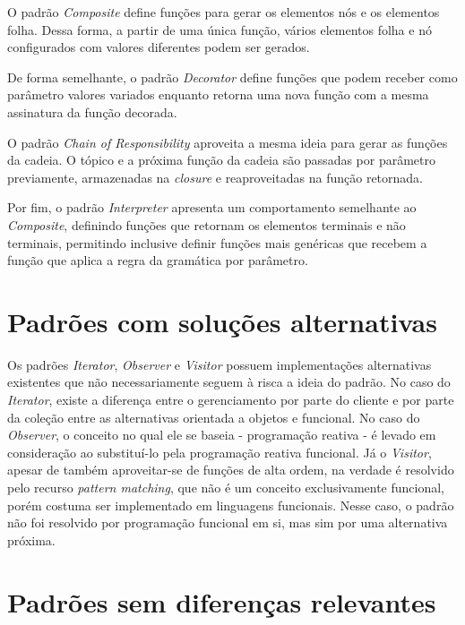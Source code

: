 O padrão \textit{Composite} define funções para gerar os 
elementos nós e os elementos folha. Dessa forma, 
a partir de uma única função, vários elementos 
folha e nó configurados com valores diferentes 
podem ser gerados.

De forma semelhante, o padrão \textit{Decorator} define 
funções que podem receber como parâmetro valores 
variados enquanto retorna uma nova função com 
a mesma assinatura da função decorada. 

O padrão \textit{Chain of Responsibility} aproveita a mesma 
ideia para gerar as funções da cadeia. O tópico e 
a próxima função da cadeia são passadas por parâmetro 
previamente, armazenadas na \textit{closure} e reaproveitadas 
na função retornada. 

Por fim, o padrão \textit{Interpreter} apresenta um comportamento 
semelhante ao \textit{Composite}, definindo funções que retornam 
os elementos terminais e não terminais, permitindo 
inclusive definir funções mais genéricas que recebem 
a função que aplica a regra da gramática por parâmetro.

\section{Padrões com soluções alternativas}

Os padrões \textit{Iterator}, \textit{Observer} e 
\textit{Visitor} possuem 
implementações alternativas existentes que não 
necessariamente 
seguem à risca a ideia do padrão. No caso do \textit{Iterator}, 
existe a diferença entre o gerenciamento por parte 
do cliente e por parte da coleção entre as 
alternativas orientada a objetos e funcional. No 
caso do \textit{Observer}, o conceito no qual ele se 
baseia - programação reativa - é levado em 
consideração ao substituí-lo pela programação 
reativa funcional. Já o \textit{Visitor}, apesar de também 
aproveitar-se de funções de alta ordem, na verdade 
é resolvido pelo recurso \textit{pattern matching}, 
que não é um conceito exclusivamente funcional, 
porém costuma ser implementado em linguagens 
funcionais. Nesse caso, o padrão não foi 
resolvido por programação funcional em si, 
mas sim por uma alternativa próxima. 

\section{Padrões sem diferenças relevantes}

